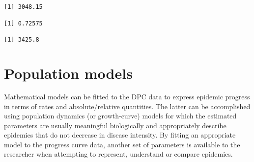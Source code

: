 \documentclass[
  letterpaper,
  DIV=11,
  numbers=noendperiod]{scrreprt}
\newenvironment{Shaded}{\begin{snugshade}}{\end{snugshade}}
\newcommand{\AttributeTok}[1]{\textcolor[rgb]{0.40,0.45,0.13}{#1}}
\newcommand{\CommentTok}[1]{\textcolor[rgb]{0.37,0.37,0.37}{#1}}
\newcommand{\ConstantTok}[1]{\textcolor[rgb]{0.56,0.35,0.01}{#1}}
\newcommand{\FunctionTok}[1]{\textcolor[rgb]{0.28,0.35,0.67}{#1}}
\newcommand{\NormalTok}[1]{\textcolor[rgb]{0.00,0.23,0.31}{#1}}
\newcommand{\SpecialCharTok}[1]{\textcolor[rgb]{0.37,0.37,0.37}{#1}}
\newcommand{\StringTok}[1]{\textcolor[rgb]{0.13,0.47,0.30}{#1}}
\begin{document}
\begin{Shaded}
\end{Shaded}

\begin{verbatim}
[1] 3048.15
\end{verbatim}

\begin{Shaded}
\end{Shaded}

\begin{verbatim}
[1] 0.72575
\end{verbatim}

\begin{Shaded}
\end{Shaded}

\begin{verbatim}
[1] 3425.8
\end{verbatim}

\hypertarget{population-models}{%
\chapter{Population models}\label{population-models}}

Mathematical models can be fitted to the DPC data to express epidemic
progress in terms of rates and absolute/relative quantities. The latter
can be accomplished using population dynamics (or growth-curve) models
for which the estimated parameters are usually meaningful biologically
and appropriately describe epidemics that do not decrease in disease
intensity. By fitting an appropriate model to the progress curve data,
another set of parameters is available to the researcher when attempting
to represent, understand or compare epidemics.
\end{document}

